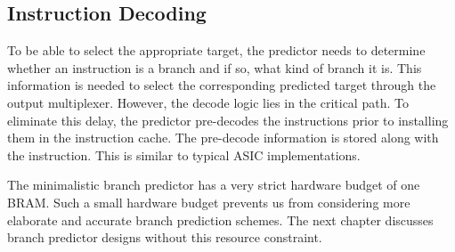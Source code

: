 \subsection{Instruction Decoding}
\label{sec:min:fpga:predecode}
To be able to select the appropriate target, the predictor needs to determine whether an instruction is a branch and if so, what kind of branch it is. This information is needed to select the corresponding predicted target through the output multiplexer. However, the decode logic lies in the critical path. To eliminate this delay, the predictor pre-decodes the instructions prior to installing them in the instruction cache. The pre-decode information is stored along with the instruction. This is similar to  typical ASIC implementations.

The minimalistic branch predictor has a very strict hardware budget of one BRAM. Such a small hardware budget prevents us from considering more elaborate and accurate branch prediction schemes. The next chapter discusses branch predictor designs without this resource constraint.



